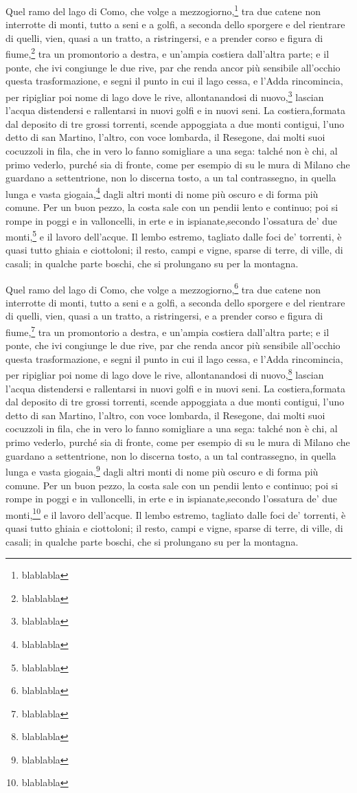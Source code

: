 \documentclass[b5paper]{book}
\begin{document}
Quel ramo del lago di Como, che volge a mezzogiorno,\footnote{blablabla} tra due catene non interrotte di monti, tutto a seni e a golfi, a seconda dello sporgere e del rientrare di quelli, vien, quasi a un tratto, a ristringersi, e a prender corso e figura di fiume,\footnote{blablabla} tra un promontorio a destra, e un’ampia costiera dall’altra parte; e il ponte, che ivi congiunge le due rive, par che renda ancor più sensibile all’occhio questa trasformazione, e segni il punto in cui il lago cessa, e l’Adda rincomincia, per ripigliar poi nome di lago dove le rive, allontanandosi di nuovo,\footnote{blablabla} lascian l’acqua distendersi e rallentarsi in nuovi golfi e in nuovi seni. La costiera,formata dal deposito di tre grossi torrenti, scende appoggiata a due monti contigui, l’uno detto di san Martino, l’altro, con voce lombarda, il Resegone, dai molti suoi cocuzzoli in fila, che in vero lo fanno somigliare a una sega: talché non è chi, al primo vederlo, purché sia di fronte, come per esempio di su le mura di Milano che guardano a settentrione, non lo discerna tosto, a un tal contrassegno, in quella lunga e vasta giogaia,\footnote{blablabla} dagli altri monti di nome più oscuro e di forma più comune. Per un buon pezzo, la costa sale con un pendii lento e continuo; poi si rompe in poggi e in valloncelli, in erte e in ispianate,secondo l’ossatura de’ due monti,\footnote{blablabla} e il lavoro dell’acque. Il lembo estremo, tagliato dalle foci de’ torrenti, è quasi tutto ghiaia e ciottoloni; il resto, campi e vigne, sparse di terre, di ville, di casali; in qualche parte boschi, che si prolungano su per la montagna. 

Quel ramo del lago di Como, che volge a mezzogiorno,\footnote{blablabla} tra due catene non interrotte di monti, tutto a seni e a golfi, a seconda dello sporgere e del rientrare di quelli, vien, quasi a un tratto, a ristringersi, e a prender corso e figura di fiume,\footnote{blablabla} tra un promontorio a destra, e un’ampia costiera dall’altra parte; e il ponte, che ivi congiunge le due rive, par che renda ancor più sensibile all’occhio questa trasformazione, e segni il punto in cui il lago cessa, e l’Adda rincomincia, per ripigliar poi nome di lago dove le rive, allontanandosi di nuovo,\footnote{blablabla} lascian l’acqua distendersi e rallentarsi in nuovi golfi e in nuovi seni. La costiera,formata dal deposito di tre grossi torrenti, scende appoggiata a due monti contigui, l’uno detto di san Martino, l’altro, con voce lombarda, il Resegone, dai molti suoi cocuzzoli in fila, che in vero lo fanno somigliare a una sega: talché non è chi, al primo vederlo, purché sia di fronte, come per esempio di su le mura di Milano che guardano a settentrione, non lo discerna tosto, a un tal contrassegno, in quella lunga e vasta giogaia,\footnote{blablabla} dagli altri monti di nome più oscuro e di forma più comune. Per un buon pezzo, la costa sale con un pendii lento e continuo; poi si rompe in poggi e in valloncelli, in erte e in ispianate,secondo l’ossatura de’ due monti,\footnote{blablabla} e il lavoro dell’acque. Il lembo estremo, tagliato dalle foci de’ torrenti, è quasi tutto ghiaia e ciottoloni; il resto, campi e vigne, sparse di terre, di ville, di casali; in qualche parte boschi, che si prolungano su per la montagna. 
\end{document}
